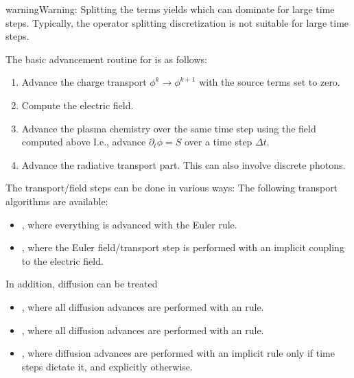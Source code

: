 \documentclass[letterpaper,10pt,english]{sphinxmanual}
\begin{document}
\begin{sphinxadmonition}{warning}{Warning:}
Splitting the terms yields  which can dominate for large time steps.
Typically, the operator splitting discretization is not suitable for large time steps.
\end{sphinxadmonition}

The basic advancement routine for  is as follows:
\begin{enumerate}
%
\item {} 
Advance the charge transport \(\phi^k \rightarrow \phi^{k+1}\) with the source terms set to zero.

\item {} 
Compute the electric field.

\item {} 
Advance the plasma chemistry over the same time step using the field computed above
I.e., advance \(\partial_t\phi = S\) over a time step \(\Delta t\).

\item {} 
Advance the radiative transport part.
This can also involve discrete photons.

\end{enumerate}

The transport/field steps can be done in various ways:
The following transport algorithms are available:
\begin{itemize}
\item {} 
, where everything is advanced with the Euler rule.

\item {} 
, where the Euler field/transport step is performed with an implicit coupling to the electric field.

\end{itemize}

In addition, diffusion can be treated
\begin{itemize}
\item {} 
, where all diffusion advances are performed with an  rule.

\item {} 
, where all diffusion advances are performed with an  rule.

\item {} 
, where diffusion advances are performed with an implicit rule only if time steps dictate it, and explicitly otherwise.

\end{itemize}
\end{document}
